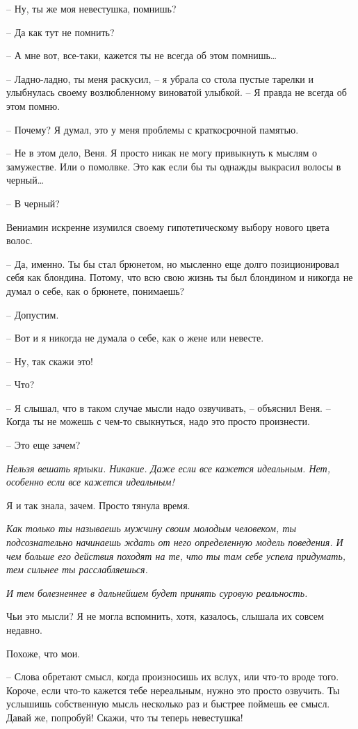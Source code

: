 \documentclass[
]{book}
\begin{document}
-- Ну, ты же моя невестушка, помнишь?

-- Да как тут не помнить?

-- А мне вот, все-таки, кажется ты не всегда об этом помнишь\ldots{}

-- Ладно-ладно, ты меня раскусил, -- я убрала со стола пустые тарелки и улыбнулась своему возлюбленному виноватой улыбкой. -- Я правда не всегда об этом помню.

-- Почему? Я думал, это у меня проблемы с краткосрочной памятью.

-- Не в этом дело, Веня. Я просто никак не могу привыкнуть к мыслям о замужестве. Или о помолвке. Это как если бы ты однажды выкрасил волосы в черный\ldots{}

-- В черный?

Вениамин искренне изумился своему гипотетическому выбору нового цвета волос.

-- Да, именно. Ты бы стал брюнетом, но мысленно еще долго позиционировал себя как блондина. Потому, что всю свою жизнь ты был блондином и никогда не думал о себе, как о брюнете, понимаешь?

-- Допустим.

-- Вот и я никогда не думала о себе, как о жене или невесте.

-- Ну, так скажи это!

-- Что?

-- Я слышал, что в таком случае мысли надо озвучивать, -- объяснил Веня. -- Когда ты не можешь с чем-то свыкнуться, надо это просто произнести.

-- Это еще зачем?

\emph{Нельзя вешать ярлыки. Никакие. Даже если все кажется идеальным. Нет, особенно если все кажется идеальным!}

Я и так знала, зачем. Просто тянула время.

\emph{Как только ты называешь мужчину своим молодым человеком, ты подсознательно начинаешь ждать от него определенную модель поведения. И чем больше его действия походят на те, что ты там себе успела придумать, тем сильнее ты расслабляешься. }

\emph{И тем болезненнее в дальнейшем будет принять суровую реальность. }

Чьи это мысли? Я не могла вспомнить, хотя, казалось, слышала их совсем недавно.

Похоже, что мои.

-- Слова обретают смысл, когда произносишь их вслух, или что-то вроде того. Короче, если что-то кажется тебе нереальным, нужно это просто озвучить. Ты услышишь собственную мысль несколько раз и быстрее поймешь ее смысл. Давай же, попробуй! Скажи, что ты теперь невестушка!
\end{document}
